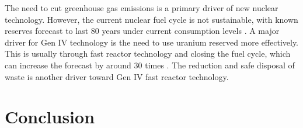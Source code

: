 \documentclass[journal]{IEEEtran}
\begin{document}
The need to cut greenhouse gas emissions is a primary driver of new nuclear technology.
However, the current nuclear fuel cycle is not sustainable, with known reserves forecast to last 80 years under current consumption levels \cite{Marques2010a}.
A major driver for Gen IV technology is the need to use uranium reserved more effectively.
This is usually through fast reactor technology and closing the fuel cycle, which can increase the forecast by around 30 times \cite{Marques2010a}.
The reduction and safe disposal of waste is another driver toward Gen IV fast reactor technology.





\section{Conclusion}






\appendices
\end{document}

